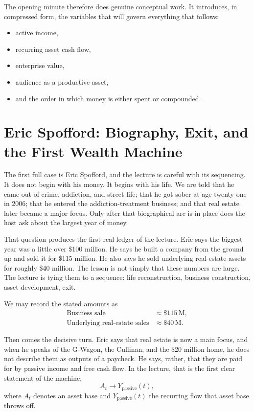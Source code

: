 The opening minute therefore does genuine conceptual work. It introduces, in compressed form, the variables that will govern everything that follows:
\begin{itemize}
\item active income,
\item recurring asset cash flow,
\item enterprise value,
\item audience as a productive asset,
\item and the order in which money is either spent or compounded.
\end{itemize}

\section{Eric Spofford: Biography, Exit, and the First Wealth Machine}

The first full case is Eric Spofford, and the lecture is careful with its sequencing. It does not begin with his money. It begins with his life. We are told that he came out of crime, addiction, and street life; that he got sober at age twenty-one in 2006; that he entered the addiction-treatment business; and that real estate later became a major focus. Only after that biographical arc is in place does the host ask about the largest year of money.

That question produces the first real ledger of the lecture. Eric says the biggest year was a little over \$100 million. He says he built a company from the ground up and sold it for \$115 million. He also says he sold underlying real-estate assets for roughly \$40 million. The lesson is not simply that these numbers are large. The lecture is tying them to a sequence: life reconstruction, business construction, asset development, exit.

We may record the stated amounts as
\begin{align}
\text{Business sale} &\approx \$115\,\text{M},\\
\text{Underlying real-estate sales} &\approx \$40\,\text{M}.
\end{align}

Then comes the decisive turn. Eric says that real estate is now a main focus, and when he speaks of the G-Wagon, the Cullinan, and the \$20 million home, he does not describe them as outputs of a paycheck. He says, rather, that they are paid for by passive income and free cash flow. In the lecture, that is the first clear statement of the machine:
\begin{equation}
A_t \longrightarrow Y_{\mathrm{passive}}(t),
\end{equation}
where \(A_t\) denotes an asset base and \(Y_{\mathrm{passive}}(t)\) the recurring flow that asset base throws off.

